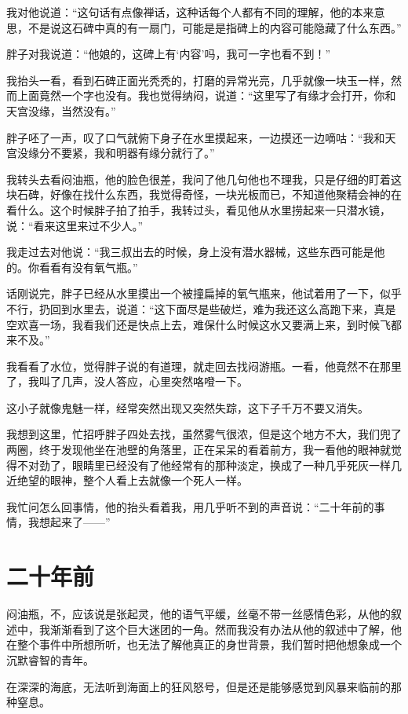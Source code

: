 我对他说道：“这句话有点像禅话，这种话每个人都有不同的理解，他的本来意思，不是说这石碑中真的有一扇门，可能是是指碑上的内容可能隐藏了什么东西。”

胖子对我说道：“他娘的，这碑上有‘内容’吗，我可一字也看不到！”

我抬头一看，看到石碑正面光秃秃的，打磨的异常光亮，几乎就像一块玉一样，然而上面竟然一个字也没有。我也觉得纳闷，说道：“这里写了有缘才会打开，你和天宫没缘，当然没有。”

胖子呸了一声，叹了口气就俯下身子在水里摸起来，一边摸还一边嘀咕：“我和天宫没缘分不要紧，我和明器有缘分就行了。”

我转头去看闷油瓶，他的脸色很差，我问了他几句他也不理我，只是仔细的盯着这块石碑，好像在找什么东西，我觉得奇怪，一块光板而已，不知道他聚精会神的在看什么。这个时候胖子拍了拍手，我转过头，看见他从水里捞起来一只潜水镜，说：“看来这里来过不少人。”

我走过去对他说：“我三叔出去的时候，身上没有潜水器械，这些东西可能是他的。你看看有没有氧气瓶。”

话刚说完，胖子已经从水里摸出一个被撞扁掉的氧气瓶来，他试着用了一下，似乎不行，扔回到水里去，说道：“这下面尽是些破烂，难为我还这么高跑下来，真是空欢喜一场，我看我们还是快点上去，难保什么时候这水又要满上来，到时候飞都来不及。”

我看看了水位，觉得胖子说的有道理，就走回去找闷游瓶。一看，他竟然不在那里了，我叫了几声，没人答应，心里突然咯噔一下。

这小子就像鬼魅一样，经常突然出现又突然失踪，这下子千万不要又消失。

我想到这里，忙招呼胖子四处去找，虽然雾气很浓，但是这个地方不大，我们兜了两圈，终于发现他坐在池壁的角落里，正在呆呆的看着前方，我一看他的眼神就觉得不对劲了，眼睛里已经没有了他经常有的那种淡定，换成了一种几乎死灰一样几近绝望的眼神，整个人看上去就像一个死人一样。

我忙问怎么回事情，他的抬头看着我，用几乎听不到的声音说：“二十年前的事情，我想起来了——”

\chapter{二十年前}

闷油瓶，不，应该说是张起灵，他的语气平缓，丝毫不带一丝感情色彩，从他的叙述中，我渐渐看到了这个巨大迷团的一角。然而我没有办法从他的叙述中了解，他在整个事件中所想所听，也无法了解他真正的身世背景，我们暂时把他想象成一个沉默睿智的青年。

在深深的海底，无法听到海面上的狂风怒号，但是还是能够感觉到风暴来临前的那种窒息。

